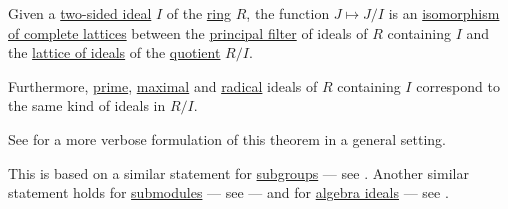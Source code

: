 \begin{theorem}\label{thm:lattice_theorem_for_ring_ideals}
  Given a \hyperref[def:semiring_ideal]{two-sided ideal} \( I \) of the \hyperref[def:ring]{ring} \( R \), the function \( J \mapsto J / I \) is an \hyperref[def:lattice/morphism]{isomorphism of complete lattices} between the \hyperref[def:lattice_ideal/principal]{principal filter} of ideals of \( R \) containing \( I \) and the \hyperref[thm:semiring_of_ideals/lattice]{lattice of ideals} of the \hyperref[def:ring/quotient]{quotient} \( R / I \).

  Furthermore, \hyperref[def:semiring_ideal/prime]{prime}, \hyperref[def:semiring_ideal/maximal]{maximal} and \hyperref[def:radical_ideal]{radical} ideals of \( R \) containing \( I \) correspond to the same kind of ideals in \( R / I \).
\end{theorem}
\begin{comments}
  \item See  for a more verbose formulation of this theorem in a general setting.
  \item This is based on a similar statement for \hyperref[def:group/subobject]{subgroups} --- see . Another similar statement holds for \hyperref[def:module/subobject]{submodules} --- see  --- and for \hyperref[def:algebra_over_ring/ideal]{algebra ideals} --- see .
\end{comments}
